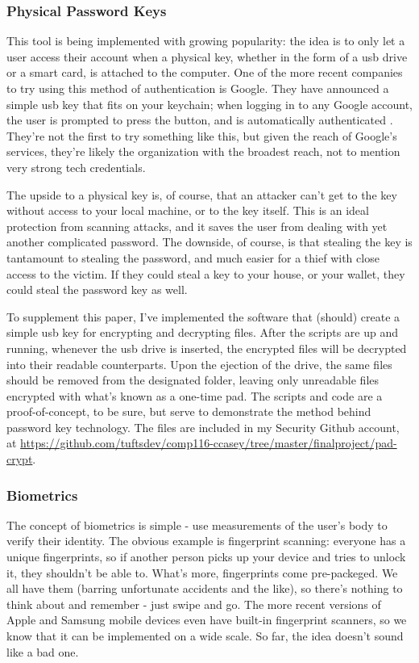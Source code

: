 \documentclass[jou]{apa6}
\begin{document}
\subsubsection{Physical Password Keys}
This tool is being implemented with growing popularity: the idea is to only let a user access their account when a physical key, whether in the form of a usb drive or a smart card, is attached to the computer. One of the more recent companies to try using this method of authentication is Google. They have announced a simple usb key that fits on your keychain; when logging in to any Google account, the user is prompted to press the button, and is automatically authenticated \parencite{simon14}. They're not the first to try something like this, but given the reach of Google's services, they're likely the organization with the broadest reach, not to mention very strong tech credentials.

The upside to a physical key is, of course, that an attacker can't get to the key without access to your local machine, or to the key itself. This is an ideal protection from scanning attacks, and it saves the user from dealing with yet another complicated password. The downside, of course, is that stealing the key is tantamount to stealing the password, and much easier for a thief with close access to the victim. If they could steal a key to your house, or your wallet, they could steal the password key as well.

To supplement this paper, I've implemented the software that (should) create a simple usb key for encrypting and decrypting files. After the scripts are up and running, whenever the usb drive is inserted, the encrypted files will be decrypted into their readable counterparts. Upon the ejection of the drive, the same files should be removed from the designated folder, leaving only unreadable files encrypted with what's known as a one-time pad. The scripts and code are a proof-of-concept, to be sure, but serve to demonstrate the method behind password key technology. The files are included in my Security Github account, at \url{https://github.com/tuftsdev/comp116-ccasey/tree/master/finalproject/pad-crypt}.

\subsubsection{Biometrics}
The concept of biometrics is simple - use measurements of the user's body to verify their identity. The obvious example is fingerprint scanning: everyone has a unique fingerprints, so if another person picks up your device and tries to unlock it, they shouldn't be able to. What's more, fingerprints come pre-packeged. We all have them (barring unfortunate accidents and the like), so there's nothing to think about and remember - just swipe and go. The more recent versions of Apple and Samsung mobile devices even have built-in fingerprint scanners, so we know that it can be implemented on a wide scale. So far, the idea doesn't sound like a bad one.
\end{document}
